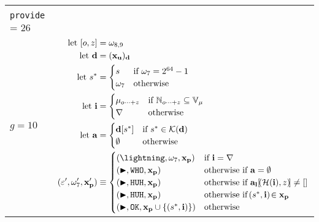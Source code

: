 \begin{longtable}{p{3.5cm} p{12.5cm}}
{  $\Omega_\Aries(\gascounter, \registers, \memory, (\mathbf{x}, \mathbf{y}), s)$ \\
  \texttt{provide} = 26 \\
  $g = 10$} &
  $\begin{aligned}
    \using [o, z] &= \registers_{8, 9} \\
    \using \mathbf{d} &= (\mathbf{x}_\mathbf{u})_\mathbf{d}\\
    \using s^* &= \begin{cases}
      s &\when \registers_7 = 2^{64} - 1 \\
      \registers_7 &\otherwise
    \end{cases} \\
    \using \mathbf{i} &= \begin{cases}
      \memory_{o\dots+z} &\when \N_{o \dots+ z} \subseteq \readable{\memory} \\
      \error &\otherwise
    \end{cases} \\
    \using \mathbf{a} &= \begin{cases}
      \mathbf{d}[s^*] &\when s^* \in \Fkeys{\mathbf{d}} \\
      \none &\otherwise
    \end{cases} \\
    (\execst', \registers'_7, \mathbf{x}'_\mathbf{p}) &\equiv \begin{cases}
      (\panic, \registers_7, \mathbf{x}_\mathbf{p}) &\when \mathbf{i} = \error \\
      (\continue, \mathtt{WHO}, \mathbf{x}_\mathbf{p}) &\otherwhen \mathbf{a} = \none \\
      (\continue, \mathtt{HUH}, \mathbf{x}_\mathbf{p}) &\otherwhen \mathbf{a}_\mathbf{l}[\tup{\blake(\mathbf{i}), z}] \ne \sq{} \\
      (\continue, \mathtt{HUH}, \mathbf{x}_\mathbf{p}) &\otherwhen \tup{s^*, \mathbf{i}} \in \mathbf{x}_\mathbf{p} \\
      (\continue, \mathtt{OK}, \mathbf{x}_\mathbf{p} \cup \set{\tup{s^*, \mathbf{i}}}) &\otherwise \\
    \end{cases} \\
  \end{aligned}$\\
  \bottomrule
\end{longtable}
